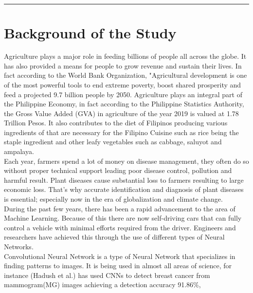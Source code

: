 
\vspace{-1cm}\noindent\rule{\textwidth}{0.4pt}
\section{Background of the Study}

Agriculture plays a major role in feeding billions of people all
across the globe. It has also provided a means for people
to grow revenue and sustain their lives. In fact according to the 
World Bank Organization, "Agricultural development 
is one of the most powerful tools to end extreme poverty, 
boost shared prosperity and feed a projected 9.7 billion people by 2050.
Agriculture plays an integral 
part of the Philippine Economy, 
in fact according to the Philippine Statistics Authority, the Gross 
Value Added (GVA) in agriculture of the year 2019
is valued at 1.78 Trillion Pesos. 
It also contributes to the diet of Filipinos producing various 
ingredients of that are necessary for the Filipino Cuisine such as rice 
being the staple ingredient and other leafy vegetables such as cabbage,
saluyot and ampalaya. \\



Each year, farmers spend a lot of money on disease management, they 
often do so without proper technical support leading poor disease 
control, pollution and harmful result. Plant diseases cause 
substantial loss to farmers resulting to large economic loss.
That's why accurate identification and diagnosis of plant diseases is 
essential; especially now in the era of globalization and climate 
change. \\

During the past few years, there has been a rapid advancement to the
area of Machine Learning. Because of this there are now self-driving cars 
that can fully control a vehicle with minimal efforts required from the
driver. Engineers and researchers have achieved this through the use 
of different types of Neural Networks. \\

Convolutional Neural Network is a type of Neural Network that specializes 
in finding patterns to images. It is being used in almost all areas of science, 
for instance (Hadush et al.) has used CNNs to detect breast 
cancer from mammogram(MG) images achieving a detection accuracy 91.86\%, 
\\

